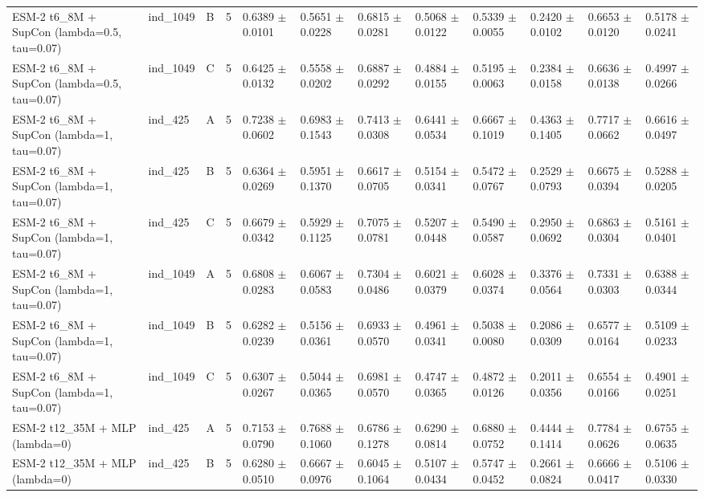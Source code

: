 \begin{table}[ht]
\begin{tabular}{llllllllllll}
ESM-2 t6\_8M + SupCon (lambda=0.5, tau=0.07) & ind\_1049 & B & 5 & 0.6389 $\pm$ 0.0101 & 0.5651 $\pm$ 0.0228 & 0.6815 $\pm$ 0.0281 & 0.5068 $\pm$ 0.0122 & 0.5339 $\pm$ 0.0055 & 0.2420 $\pm$ 0.0102 & 0.6653 $\pm$ 0.0120 & 0.5178 $\pm$ 0.0241 \\
ESM-2 t6\_8M + SupCon (lambda=0.5, tau=0.07) & ind\_1049 & C & 5 & 0.6425 $\pm$ 0.0132 & 0.5558 $\pm$ 0.0202 & 0.6887 $\pm$ 0.0292 & 0.4884 $\pm$ 0.0155 & 0.5195 $\pm$ 0.0063 & 0.2384 $\pm$ 0.0158 & 0.6636 $\pm$ 0.0138 & 0.4997 $\pm$ 0.0266 \\
ESM-2 t6\_8M + SupCon (lambda=1, tau=0.07) & ind\_425 & A & 5 & 0.7238 $\pm$ 0.0602 & 0.6983 $\pm$ 0.1543 & 0.7413 $\pm$ 0.0308 & 0.6441 $\pm$ 0.0534 & 0.6667 $\pm$ 0.1019 & 0.4363 $\pm$ 0.1405 & 0.7717 $\pm$ 0.0662 & 0.6616 $\pm$ 0.0497 \\
ESM-2 t6\_8M + SupCon (lambda=1, tau=0.07) & ind\_425 & B & 5 & 0.6364 $\pm$ 0.0269 & 0.5951 $\pm$ 0.1370 & 0.6617 $\pm$ 0.0705 & 0.5154 $\pm$ 0.0341 & 0.5472 $\pm$ 0.0767 & 0.2529 $\pm$ 0.0793 & 0.6675 $\pm$ 0.0394 & 0.5288 $\pm$ 0.0205 \\
ESM-2 t6\_8M + SupCon (lambda=1, tau=0.07) & ind\_425 & C & 5 & 0.6679 $\pm$ 0.0342 & 0.5929 $\pm$ 0.1125 & 0.7075 $\pm$ 0.0781 & 0.5207 $\pm$ 0.0448 & 0.5490 $\pm$ 0.0587 & 0.2950 $\pm$ 0.0692 & 0.6863 $\pm$ 0.0304 & 0.5161 $\pm$ 0.0401 \\
ESM-2 t6\_8M + SupCon (lambda=1, tau=0.07) & ind\_1049 & A & 5 & 0.6808 $\pm$ 0.0283 & 0.6067 $\pm$ 0.0583 & 0.7304 $\pm$ 0.0486 & 0.6021 $\pm$ 0.0379 & 0.6028 $\pm$ 0.0374 & 0.3376 $\pm$ 0.0564 & 0.7331 $\pm$ 0.0303 & 0.6388 $\pm$ 0.0344 \\
ESM-2 t6\_8M + SupCon (lambda=1, tau=0.07) & ind\_1049 & B & 5 & 0.6282 $\pm$ 0.0239 & 0.5156 $\pm$ 0.0361 & 0.6933 $\pm$ 0.0570 & 0.4961 $\pm$ 0.0341 & 0.5038 $\pm$ 0.0080 & 0.2086 $\pm$ 0.0309 & 0.6577 $\pm$ 0.0164 & 0.5109 $\pm$ 0.0233 \\
ESM-2 t6\_8M + SupCon (lambda=1, tau=0.07) & ind\_1049 & C & 5 & 0.6307 $\pm$ 0.0267 & 0.5044 $\pm$ 0.0365 & 0.6981 $\pm$ 0.0570 & 0.4747 $\pm$ 0.0365 & 0.4872 $\pm$ 0.0126 & 0.2011 $\pm$ 0.0356 & 0.6554 $\pm$ 0.0166 & 0.4901 $\pm$ 0.0251 \\
ESM-2 t12\_35M + MLP (lambda=0) & ind\_425 & A & 5 & 0.7153 $\pm$ 0.0790 & 0.7688 $\pm$ 0.1060 & 0.6786 $\pm$ 0.1278 & 0.6290 $\pm$ 0.0814 & 0.6880 $\pm$ 0.0752 & 0.4444 $\pm$ 0.1414 & 0.7784 $\pm$ 0.0626 & 0.6755 $\pm$ 0.0635 \\
ESM-2 t12\_35M + MLP (lambda=0) & ind\_425 & B & 5 & 0.6280 $\pm$ 0.0510 & 0.6667 $\pm$ 0.0976 & 0.6045 $\pm$ 0.1064 & 0.5107 $\pm$ 0.0434 & 0.5747 $\pm$ 0.0452 & 0.2661 $\pm$ 0.0824 & 0.6666 $\pm$ 0.0417 & 0.5106 $\pm$ 0.0330 \\

\end{tabular}
\end{table}
